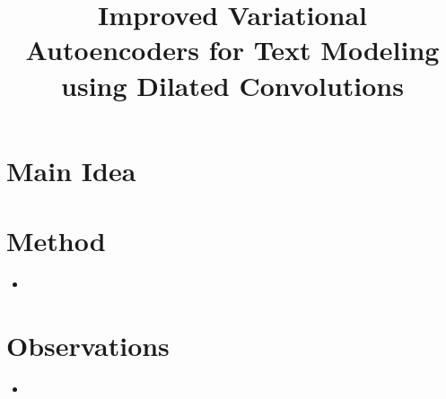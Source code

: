\documentclass[12pt]{scrartcl}
\begin{document}
\title{Improved Variational Autoencoders for Text Modeling using Dilated Convolutions}
\author{}
\date{}
\maketitle

\section{Main Idea}
  \cite{yang2017improved}

\section{Method}
  \begin{itemize}
    \item 
  \end{itemize}

\section{Observations}
  \begin{itemize}
    \item 
  \end{itemize}



\end{document}
